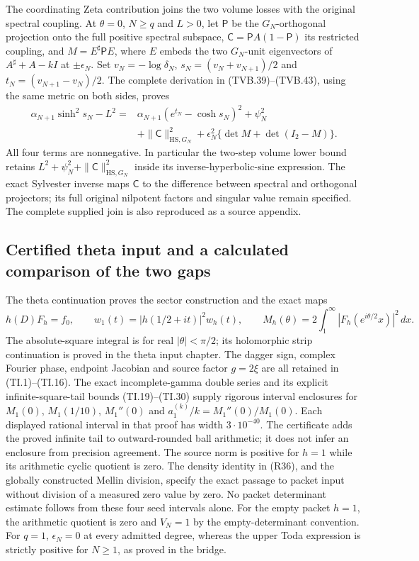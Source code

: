 The coordinating Zeta contribution joins the two volume losses with the
original spectral coupling. At $\theta=0$, $N\ge q$ and $L>0$, let
$\mathsf P$ be the $G_N$-orthogonal projection onto the full positive
spectral subspace, $\mathsf C=\mathsf PA(1-\mathsf P)$ its restricted
coupling, and $M=E^\sharp\mathsf PE$, where $E$ embeds the two
$G_N$-unit eigenvectors of $A^\sharp+A-kI$ at $\pm\epsilon_N$.
Set $v_N=-\log\delta_N$, $s_N=(v_N+v_{N+1})/2$ and
$t_N=(v_{N+1}-v_N)/2$. The complete derivation in
(TVB.39)--(TVB.43), using the same metric on both sides, proves
\[
\begin{aligned}
 \alpha_{N+1}\sinh^2s_N-L^2
 ={}&\alpha_{N+1}(e^{t_N}-\cosh s_N)^2+\psi_N^2\\
 &+\|\mathsf C\|_{\mathrm{HS},G_N}^2
  +\epsilon_N^2\{\det M+\det(I_2-M)\}.
\end{aligned}
\tag{R35}
\]
All four terms are nonnegative. In particular the two-step volume lower
bound retains $L^2+\psi_N^2+\|\mathsf C\|_{\mathrm{HS},G_N}^2$
inside its inverse-hyperbolic-sine expression. The exact Sylvester inverse
maps $\mathsf C$ to the difference between spectral and orthogonal
projectors; its full original nilpotent factors and singular value remain
specified. The complete supplied join is also reproduced as a source appendix.

\subsection{Certified theta input and a calculated comparison of the two gaps}

The theta continuation proves the sector construction and the exact maps
\[
 h(D)F_h=f_0,\qquad
 w_1(t)=|h(1/2+it)|^2w_h(t),\qquad
 M_h(\theta)=2\int_1^\infty|F_h(e^{i\theta/2}x)|^2\,dx.
\tag{R36}
\]
The absolute-square integral is for real $|\theta|<\pi/2$; its
holomorphic strip continuation is proved in the theta input chapter.
The dagger sign, complex Fourier phase, endpoint Jacobian and source
factor $g=2\xi$ are all retained in (TI.1)--(TI.16). The exact
incomplete-gamma double series and its explicit infinite-square-tail
bounds (TI.19)--(TI.30) supply rigorous interval enclosures for
$M_1(0)$, $M_1(1/10)$, $M_1''(0)$ and
$a_1^{(k)}/k=M_1''(0)/M_1(0)$. Each displayed rational interval in
that proof has width $3\cdot10^{-40}$. The certificate adds the proved
infinite tail to outward-rounded ball arithmetic; it does not infer
an enclosure from precision agreement. The source norm is positive
for $h=1$ while its arithmetic cyclic quotient is zero. The density
identity in (R36), and the globally constructed Mellin division, specify
the exact passage to packet input without division of a measured zero
value by zero. No packet determinant estimate follows from these four
seed intervals alone.
For the empty packet $h=1$, the arithmetic quotient is zero and
$V_N=1$ by the empty-determinant convention. For $q=1$,
$\epsilon_N=0$ at every admitted degree, whereas the upper Toda
expression is strictly positive for $N\ge1$, as proved in the bridge.

